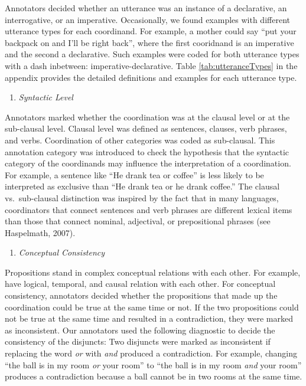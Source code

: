 \documentclass[,man,floatsintext]{apa6}
\providecommand{\tightlist}{%
  \setlength{\itemsep}{0pt}\setlength{\parskip}{0pt}}
\begin{document}
Annotators decided whether an utterance was an instance of a declarative, an interrogative, or an imperative. Occasionally, we found examples with different utterance types for each coordinand. For example, a mother could say \enquote{put your backpack on and I'll be right back}, where the first cooridnand is an imperative and the second a declarative. Such examples were coded for both utterance types with a dash inbetween: imperative-declarative. Table \ref{tab:utteranceTypes} in the appendix provides the detailed definitions and examples for each utterance type.

\begin{enumerate}
\def\labelenumi{\arabic{enumi}.}
\setcounter{enumi}{3}
\tightlist
\item
  \emph{Syntactic Level}
\end{enumerate}

Annotators marked whether the coordination was at the clausal level or at the sub-clausal level. Clausal level was defined as sentences, clauses, verb phrases, and verbs. Coordination of other categories was coded as sub-clausal. This annotation category was introduced to check the hypothesis that the syntactic category of the coordinands may influence the interpretation of a coordination. For example, a sentence like \enquote{He drank tea or coffee} is less likely to be interpreted as exclusive than \enquote{He drank tea or he drank coffee.} The clausal vs.~sub-clausal distinction was inspired by the fact that in many languages, coordinators that connect sentences and verb phrases are different lexical items than those that connect nominal, adjectival, or prepositional phrases (see Haspelmath, 2007).

\begin{enumerate}
\def\labelenumi{\arabic{enumi}.}
\setcounter{enumi}{3}
\tightlist
\item
  \emph{Conceptual Consistency}
\end{enumerate}

Propositions stand in complex conceptual relations with each other. For example, have logical, temporal, and causal relation with each other. For conceptual consistency, annotators decided whether the propositions that made up the coordination could be true at the same time or not. If the two propositions could not be true at the same time and resulted in a contradiction, they were marked as inconsistent. Our annotators used the following diagnostic to decide the consistency of the disjuncts: Two disjuncts were marked as inconsistent if replacing the word \emph{or} with \emph{and} produced a contradiction. For example, changing \enquote{the ball is in my room \emph{or} your room} to \enquote{the ball is in my room \emph{and} your room} produces a contradiction because a ball cannot be in two rooms at the same time.
\end{document}
